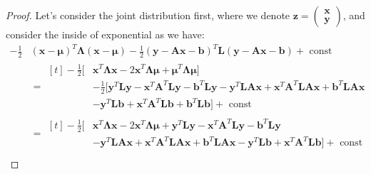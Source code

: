\begin{proof}
    Let's consider the joint distribution first, where we denote $\boldsymbol z = \begin{pmatrix}\boldsymbol x \\ \boldsymbol y \end{pmatrix}$, and consider the inside of exponential as we have:
    \begin{equation*}
    \begin{aligned}
        -\frac{1}{2}&(\boldsymbol x - \boldsymbol \mu)^T\boldsymbol \Lambda(\boldsymbol x - \boldsymbol \mu) - \frac{1}{2}(\boldsymbol y - \boldsymbol A\boldsymbol x - \boldsymbol b)^T\boldsymbol L(\boldsymbol y - \boldsymbol A\boldsymbol x - \boldsymbol b) + \text{ const } \\
        &= \begin{aligned}[t]
        -\frac{1}{2}\Big[ &\boldsymbol x^T\boldsymbol \Lambda\boldsymbol x - 2\boldsymbol x^T\boldsymbol \Lambda\boldsymbol \mu + \boldsymbol \mu^T\boldsymbol \Lambda\boldsymbol \mu \Big] \\
        &- \frac{1}{2}\Big[ \boldsymbol y^T\boldsymbol L \boldsymbol y - \boldsymbol x^T\boldsymbol A^T \boldsymbol L\boldsymbol y - \boldsymbol b^T\boldsymbol L\boldsymbol y  -\boldsymbol y^T\boldsymbol L\boldsymbol A\boldsymbol x + \boldsymbol x^T\boldsymbol A^T \boldsymbol L\boldsymbol A\boldsymbol x + \boldsymbol b^T\boldsymbol L\boldsymbol A\boldsymbol x \\
        &-\boldsymbol y^T\boldsymbol L\boldsymbol b + \boldsymbol x^T\boldsymbol A^T \boldsymbol L\boldsymbol b + \boldsymbol b^T\boldsymbol L\boldsymbol b\Big] + \text{ const }
        \end{aligned} \\
        &= \begin{aligned}[t]
        -\frac{1}{2}\Big[ &\boldsymbol x^T\boldsymbol \Lambda\boldsymbol x - 2\boldsymbol x^T\boldsymbol \Lambda\boldsymbol \mu + \boldsymbol y^T\boldsymbol L \boldsymbol y - \boldsymbol x^T\boldsymbol A^T \boldsymbol L\boldsymbol y - \boldsymbol b^T\boldsymbol L\boldsymbol y   \\
        &-\boldsymbol y^T\boldsymbol L\boldsymbol A\boldsymbol x + \boldsymbol x^T\boldsymbol A^T \boldsymbol L\boldsymbol A\boldsymbol x + \boldsymbol b^T\boldsymbol L\boldsymbol A\boldsymbol x -\boldsymbol y^T\boldsymbol L\boldsymbol b + \boldsymbol x^T\boldsymbol A^T \boldsymbol L\boldsymbol b \Big] + \text{ const }
        \end{aligned} \\

\end{aligned}
\end{equation*}
\end{proof}
